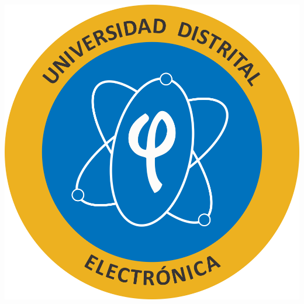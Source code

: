 \documentclass{article}
\begin{document}
\begin{center}
\begin{minipage}{.16\linewidth}
    \includegraphics[width=.7\linewidth]{media/images/LOGO_IE.png}
    ~\vfill
    ~\vfill
  \end{minipage}
\end{center}

\vspace{2cm}
\end{document}
